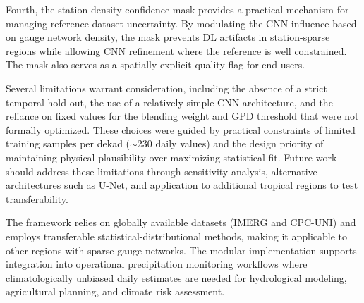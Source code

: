 \documentclass[remotesensing,article,submit,pdftex,moreauthors]{Definitions/mdpi}
\begin{document}
Fourth, the station density confidence mask provides a practical
mechanism for managing reference dataset uncertainty. By modulating the
CNN influence based on gauge network density, the mask prevents DL
artifacts in station-sparse regions while allowing CNN refinement where
the reference is well constrained. The mask also serves as a spatially
explicit quality flag for end users.

Several limitations warrant consideration, including the absence of a
strict temporal hold-out, the use of a relatively simple CNN
architecture, and the reliance on fixed values for the blending weight
and GPD threshold that were not formally optimized. These choices were
guided by practical constraints of limited training samples per dekad
($\sim$230 daily values) and the design priority of maintaining
physical plausibility over maximizing statistical fit. Future work
should address these limitations through sensitivity analysis,
alternative architectures such as U-Net, and application to additional
tropical regions to test transferability.

The framework relies on globally available datasets (IMERG and CPC-UNI)
and employs transferable statistical-distributional methods, making it
applicable to other regions with sparse gauge networks. The modular
implementation supports integration into operational precipitation
monitoring workflows where climatologically unbiased daily estimates are
needed for hydrological modeling, agricultural planning, and climate
risk assessment.


\vspace{6pt}





\end{document}
